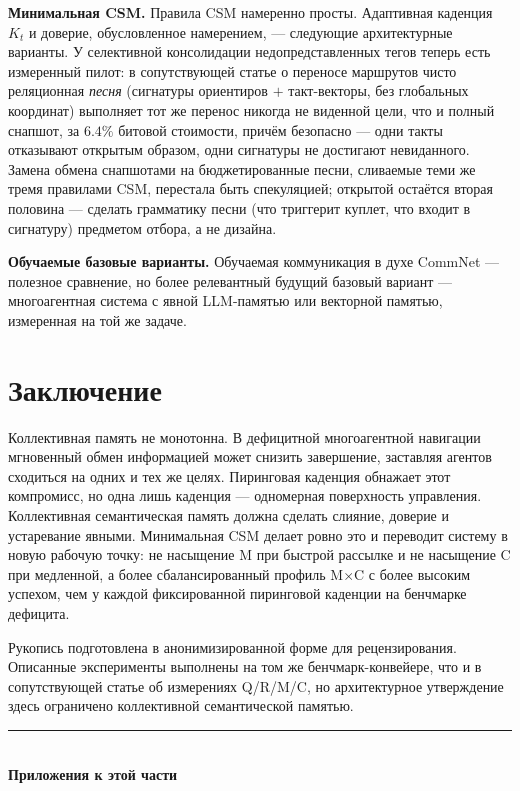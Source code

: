 \documentclass{article}
\begin{document}
\textbf{Минимальная CSM.} Правила CSM намеренно просты. Адаптивная
каденция $K_t$ и доверие, обусловленное намерением, --- следующие
архитектурные варианты. У селективной консолидации недопредставленных
тегов теперь есть измеренный пилот: в сопутствующей статье о переносе
маршрутов чисто реляционная \emph{песня} (сигнатуры ориентиров $+$
такт-векторы, без глобальных координат) выполняет тот же перенос
никогда не виденной цели, что и полный снапшот, за $6.4\%$ битовой
стоимости, причём безопасно --- одни такты отказывают открытым
образом, одни сигнатуры не достигают невиданного. Замена обмена
снапшотами на бюджетированные песни, сливаемые теми же тремя правилами
CSM, перестала быть спекуляцией; открытой остаётся вторая половина ---
сделать грамматику песни (что триггерит куплет, что входит в
сигнатуру) предметом отбора, а не дизайна.

\textbf{Обучаемые базовые варианты.} Обучаемая коммуникация в духе
CommNet --- полезное сравнение, но более релевантный будущий базовый
вариант --- многоагентная система с явной LLM-памятью или векторной
памятью, измеренная на той же задаче.

\section{Заключение}

Коллективная память не монотонна. В дефицитной многоагентной
навигации мгновенный обмен информацией может снизить завершение,
заставляя агентов сходиться на одних и тех же целях. Пиринговая
каденция обнажает этот компромисс, но одна лишь каденция --- одномерная
поверхность управления. Коллективная семантическая память должна
сделать слияние, доверие и устаревание явными. Минимальная CSM делает
ровно это и переводит систему в новую рабочую точку: не насыщение M
при быстрой рассылке и не насыщение C при медленной, а более
сбалансированный профиль M$\times$C с более высоким успехом, чем у
каждой фиксированной пиринговой каденции на бенчмарке дефицита.

\begin{ack}
Рукопись подготовлена в анонимизированной форме для рецензирования.
Описанные эксперименты выполнены на том же бенчмарк-конвейере, что и в
сопутствующей статье об измерениях Q/R/M/C, но архитектурное
утверждение здесь ограничено коллективной семантической памятью.
\end{ack}

{\small

}

\FloatBarrier
\begin{center}\rule{0.55\linewidth}{0.4pt}\\[2pt]\textbf{Приложения к этой части}\end{center}
\end{document}
